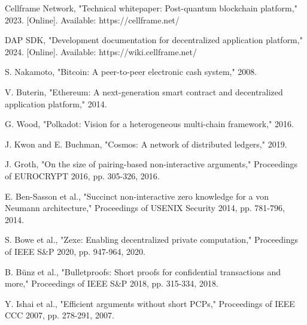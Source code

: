\documentclass[11pt,a4paper]{article}
\begin{document}
\begin{thebibliography}{99}
Cellframe Network, "Technical whitepaper: Post-quantum blockchain platform," 2023. [Online]. Available: https://cellframe.net/

DAP SDK, "Development documentation for decentralized application platform," 2024. [Online]. Available: https://wiki.cellframe.net/

S. Nakamoto, "Bitcoin: A peer-to-peer electronic cash system," 2008.

V. Buterin, "Ethereum: A next-generation smart contract and decentralized application platform," 2014.

G. Wood, "Polkadot: Vision for a heterogeneous multi-chain framework," 2016.

J. Kwon and E. Buchman, "Cosmos: A network of distributed ledgers," 2019.

J. Groth, "On the size of pairing-based non-interactive arguments," Proceedings of EUROCRYPT 2016, pp. 305-326, 2016.

E. Ben-Sasson et al., "Succinct non-interactive zero knowledge for a von Neumann architecture," Proceedings of USENIX Security 2014, pp. 781-796, 2014.

S. Bowe et al., "Zexe: Enabling decentralized private computation," Proceedings of IEEE S\&P 2020, pp. 947-964, 2020.

B. Bünz et al., "Bulletproofs: Short proofs for confidential transactions and more," Proceedings of IEEE S\&P 2018, pp. 315-334, 2018.

Y. Ishai et al., "Efficient arguments without short PCPs," Proceedings of IEEE CCC 2007, pp. 278-291, 2007.

\end{thebibliography}
\end{document}
